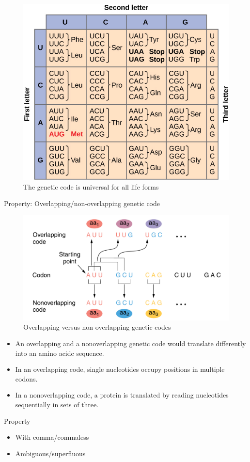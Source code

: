 \documentclass[11pt,dvipsnames,ignorenonframetext,aspectratio=169]{beamer}
\providecommand{\tightlist}{%
  \setlength{\itemsep}{0pt}\setlength{\parskip}{0pt}}
\begin{document}
\begin{frame}{}
\protect\hypertarget{section-5}{}

\begin{figure}
\includegraphics[width=0.45\linewidth]{./../images/nucleotide_codons} \caption{The genetic code is universal for all life forms}\label{fig:universality}
\end{figure}

\end{frame}

\begin{frame}{Property: Overlapping/non-overlapping genetic code}
\protect\hypertarget{property-overlappingnon-overlapping-genetic-code}{}

\begin{figure}
\includegraphics[width=0.4\linewidth]{./../images/overlap_non_overlap} \caption{Overlapping versus non overlapping genetic codes}\label{fig:overlap-n-non}
\end{figure}

\begin{itemize}
\tightlist
\item
  An overlapping and a nonoverlapping genetic code would translate
  differently into an amino acidc sequence.
\item
  In an overlapping code, single nucleotides occupy positions in
  multiple codons.
\item
  In a nonoverlapping code, a protein is translated by reading
  nucleotides sequentially in sets of three.
\end{itemize}

\end{frame}

\begin{frame}{Property}
\protect\hypertarget{property}{}

\begin{itemize}
\tightlist
\item
  With comma/commaless
\item
  Ambiguous/superfluous
\end{itemize}

\end{frame}
\end{document}
